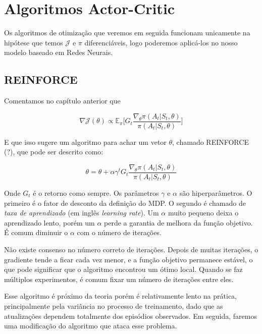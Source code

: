 \chapter{Algoritmos Actor-Critic}
\label{cap:otimizacao}

Os algoritmos de otimização que veremos em seguida funcionam unicamente na hipótese que temos $\mathcal{J}$ e $\pi$ diferenciáveis, logo poderemos aplicá-los no nosso modelo baseado em Redes Neurais.

\section{REINFORCE}

Comentamos no capítulo anterior que

\begin{equation}
    \nabla \mathcal{J}(\theta) 
    \propto \mathbb{E}_{\pi} \Big[ G_t \frac{\nabla_{\theta} \pi(A_t | S_t, \theta)}{\pi(A_t | S_t, \theta)} \Big]
\end{equation}

E que isso sugere um algoritmo para achar um vetor $\theta$, chamado REINFORCE (?), que pode ser descrito como:

\begin{equation}
    \theta = \theta + \alpha \gamma^t G_t \frac{\nabla_{\theta} \pi(A_t | S_t, \theta)}{\pi(A_t | S_t, \theta)} 
\end{equation}

Onde $G_t$ é o retorno como sempre. Os parâmetros $\gamma$ e $\alpha$ são hiperparâmetros. O primeiro é o fator de desconto da definição do MDP. O segundo é chamado de \textit{taxa de aprendizado} (em inglês \textit{learning rate}). Um $\alpha$ muito pequeno deixa o aprendizado lento, porém um $\alpha$ perde a garantia de melhora da função objetivo. É comum diminuir o $\alpha$ com o número de iterações.

Não existe consenso no número correto de iterações. Depois de muitas iterações, o gradiente tende a ficar cada vez menor, e a função objetivo permanece estável, o que pode significar que o algoritmo encontrou um ótimo local. Quando se faz múltiplos experimentos, é comum fixar um número de iterações entre eles.

Esse algoritmo é próximo da teoria porém é relativamente lento na prática, principalmente pela variância no processo de treinamento, dado que as atualizações dependem totalmente dos episódios observados. Em seguida, faremos uma modificação do algoritmo que ataca esse problema.

